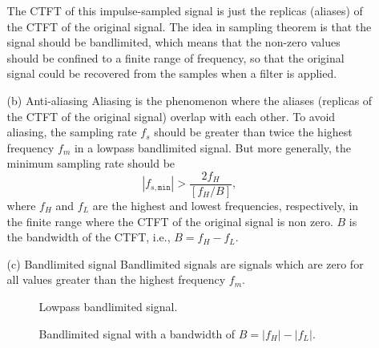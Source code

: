 \documentclass[a4paper, 12pt]{article}
\begin{document}
\begin{itemize}
\begin{itemize}
The CTFT of this impulse-sampled signal is just the replicas (aliases) of the CTFT of the original signal. The idea in sampling theorem is that the signal should be bandlimited, which means that the non-zero values should be confined to a finite range of frequency, so that the original signal could be recovered from the samples when a filter is applied.

\item[(b)]{Anti-aliasing}
Aliasing is the phenomenon where the aliases (replicas of the CTFT of the original signal) overlap with each other. To avoid aliasing, the sampling rate $f_{s}$ should be greater than twice the highest frequency $f_{m}$ in a lowpass bandlimited signal. But more generally, the minimum sampling rate should be
\begin{equation}
|f_{s, \mathtt{min}}| > \frac{2f_{H}}{[f_{H}/B]},
\end{equation}
where $f_{H}$ and $f_{L}$ are the highest and lowest frequencies, respectively, in the finite range where the CTFT of the original signal is non zero. $B$ is the bandwidth of the CTFT, i.e., $B = f_{H} - f_{L}$.

\item[(c)]{Bandlimited signal}
Bandlimited signals are signals which are zero for all values greater than the highest frequency $f_{m}$. 

\begin{figure}[h!]
\caption{\label{fig:lowpass}Lowpass bandlimited signal.}
\end{figure}


\begin{figure}[h!]
\caption{\label{fig:lowpass}Bandlimited signal with a bandwidth of $B = |f_{H}| - |f_{L}|$.}
\end{figure}


\end{itemize}
\end{itemize}
\end{document}
